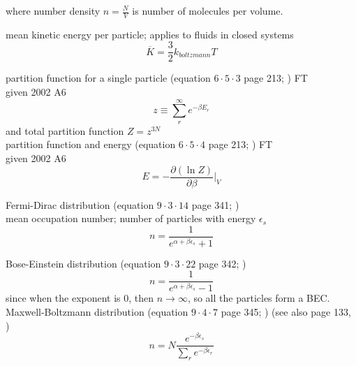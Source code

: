 \documentclass[12pt]{article}  %
\def\qualifyingyear{F}
\begin{document}
where number density $ n = \frac{N}{V}$ is number of molecules per volume. 

mean kinetic energy per particle; applies to fluids in closed systems
\begin{equation}
\overline{K} = \frac{3}{2} k_{boltzmann} T
\end{equation}

partition function for a single particle (equation $6 \cdot 5 \cdot 3$ page 213; \cite{ReifThermo}) 
\if\qualifyingyear T
\\ 
given 2002 A6
\fi
\begin{equation}
z \equiv \sum_r^\infty e^{-\beta E_r}
\end{equation}
and total partition function $Z = z^{3N}$ \\ 
partition function and energy (equation $6 \cdot 5 \cdot 4$ page 213; \cite{ReifThermo})
\if\qualifyingyear T
\\ 
given 2002 A6
\fi
\begin{equation}
E = - \frac{\partial (\ln Z)}{\partial \beta} |_V
\end{equation}

Fermi-Dirac distribution  (equation $9 \cdot 3 \cdot 14$ page 341; \cite{ReifThermo}) \\ 
mean occupation number; number of particles with energy $\epsilon_s$
\begin{equation}
n = \frac{1}{e^{\alpha + \beta \epsilon_s} +1}
\end{equation}

Bose-Einstein distribution  (equation $9 \cdot 3 \cdot 22$ page 342; \cite{ReifThermo})
\begin{equation}
n = \frac{1}{e^{\alpha + \beta \epsilon_s}-1} 
\end{equation}
since when the exponent is 0, then $n \rightarrow \infty$, so all the particles form a BEC.\\ 
Maxwell-Boltzmann distribution  (equation $9 \cdot 4 \cdot 7$ page 345; \cite{ReifThermo})
(see also page 133, \cite{TiplerMP})
\begin{equation}
n = N \frac{ e^{-\beta \epsilon_s }}{ \sum_r e^{-\beta \epsilon_r} }
\end{equation}
\end{document}
